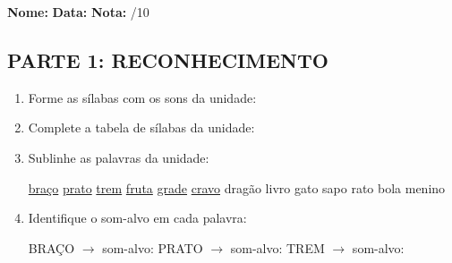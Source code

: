 \begin{exercicio}

\noindent\textbf{Nome:} \underline{\hspace{3.2cm}} \quad \textbf{Data:} \underline{\hspace{1.6cm}} \quad \textbf{Nota:} \underline{\hspace{0.9cm}}/10


\subsection*{PARTE 1: RECONHECIMENTO}

\begin{enumerate}

  \item Forme as sílabas com os sons da unidade:

\begin{center}
\end{center}

  \item Complete a tabela de sílabas da unidade:

\begin{center}
\end{center}

  \item Sublinhe as palavras da unidade:

\begin{center}
  \uline{braço} \quad \uline{prato} \quad \uline{trem} \quad \uline{fruta} \quad \uline{grade} \quad \uline{cravo} \quad dragão \quad livro \quad gato \quad sapo \quad rato \quad bola \quad menino
\end{center}

  \item Identifique o som-alvo em cada palavra:
  \begin{center}
  BRAÇO $\rightarrow$ som-alvo: \underline{\hspace{1cm}} \quad PRATO $\rightarrow$ som-alvo: \underline{\hspace{1cm}} \quad TREM $\rightarrow$ som-alvo: \underline{\hspace{1cm}}
  \end{center}


\end{enumerate}
\end{exercicio}
